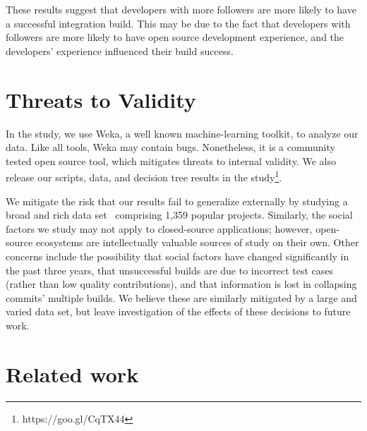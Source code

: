 \documentclass[10pt, conference]{IEEEtran}
\begin{document}
These results suggest that developers
with more followers are more likely to have a successful integration build.
This may be due to the fact that developers with followers are more likely to
have open source development experience, and the developers' experience
influenced their build success.

\section{Threats to Validity}
\label{sec-threats}

In the study, we use Weka, a well known machine-learning toolkit,
to analyze our data.
Like all tools, Weka may contain bugs. 
Nonetheless, it is a community tested open source tool, which mitigates threats to 
internal validity. We also release our scripts, data, and decision tree 
results in the study\footnote{https://goo.gl/CqTX44}. 

We mitigate the risk that our results fail to 
generalize externally by studying a broad and rich 
data set~\cite{msr17challenge} comprising 1,359 popular projects.
Similarly, the social factors we study may not apply to closed-source
applications; however, open-source ecosystems are intellectually
valuable sources of study on their own. 
%
 Other concerns include the possibility that social factors
 have changed significantly in the past three years, that unsuccessful
 builds are due to
 incorrect test cases (rather than low quality contributions), and that
 information is lost in collapsing commits' multiple builds. We believe these
 are similarly mitigated by a large and varied data set, but leave investigation
 of the effects of these decisions to future work. 
 
\section{Related work}
\end{document}
